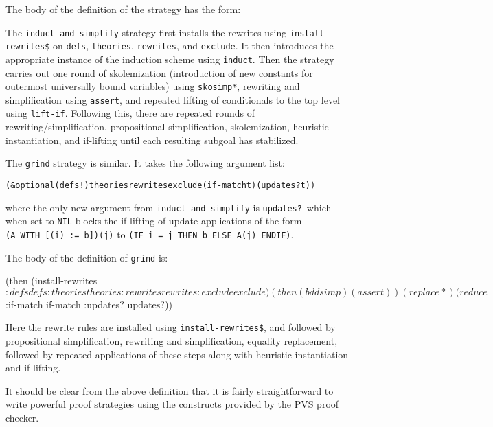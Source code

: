 \documentclass[11pt,twoside]{book}
\begin{document}
The body of the definition of the strategy has the form:

The \texttt{induct-and-simplify} strategy first installs the rewrites
using \texttt{install-rewrites\$} on \texttt{defs}, \texttt{theories}, \texttt{rewrites}, and \texttt{exclude}\@.  It then introduces the appropriate
instance of the induction scheme using \texttt{induct}\@.  Then the strategy
carries out one round of skolemization (introduction of new constants for
outermost universally bound variables) using \texttt{skosimp*}, rewriting
and simplification using \texttt{assert}, and repeated lifting of conditionals
to the top level using \texttt{lift-if}.  Following this, there are repeated
rounds of rewriting/simplification, propositional simplification,
skolemization, heuristic instantiation, and if-lifting until each
resulting subgoal has stabilized.

The \texttt{grind} strategy is similar.  It takes the following argument
list:
\begin{alltt}
  (&optional (defs !) theories rewrites exclude (if-match t) (updates? t))
\end{alltt}
where the only new argument from \texttt{induct-and-simplify} is \texttt{updates?}\ which when set to \texttt{NIL} blocks the if-lifting of
update applications of the form \texttt{(A~WITH~[(i)~:=~b])(j)} to
\texttt{(IF~i~=~j~THEN~b~ELSE~A(j)~ENDIF)}\@.

The body of the definition of \texttt{grind} is:
\begin{smalltt}
  (then
   (install-rewrites$ :defs defs :theories theories :rewrites rewrites
    :exclude exclude)
   (then (bddsimp) (assert)) (replace*)
   (reduce$ :if-match if-match :updates? updates?))
\end{smalltt}

Here the rewrite rules are installed using \texttt{install-rewrites\$},
and followed by propositional simplification, rewriting and
simplification,  equality replacement, followed by repeated
applications of these steps along with heuristic instantiation and
if-lifting. 

It should be clear from the above definition that it is fairly
straightforward to write powerful proof strategies using the
constructs provided by the PVS proof checker.  
\end{document}
